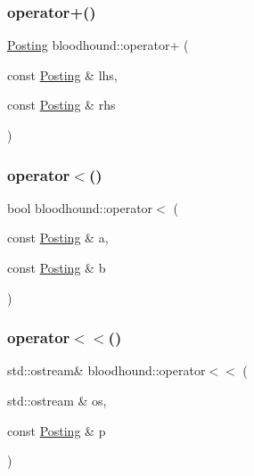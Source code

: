 \mbox{\label{namespacebloodhound_a0b07d73bf298a56b219b270d5fa70b83}} 
\subsubsection{\texorpdfstring{operator+()}{operator+()}}
{\footnotesize\ttfamily \hyperlink{structbloodhound_1_1Posting}{Posting} bloodhound\+::operator+ (\begin{DoxyParamCaption}\item[{const \hyperlink{structbloodhound_1_1Posting}{Posting} \&}]{lhs,  }\item[{const \hyperlink{structbloodhound_1_1Posting}{Posting} \&}]{rhs }\end{DoxyParamCaption})}

\mbox{\label{namespacebloodhound_ae20cf3f97304dde56dd526eaa08c41dc}} 
\subsubsection{\texorpdfstring{operator$<$()}{operator<()}}
{\footnotesize\ttfamily bool bloodhound\+::operator$<$ (\begin{DoxyParamCaption}\item[{const \hyperlink{structbloodhound_1_1Posting}{Posting} \&}]{a,  }\item[{const \hyperlink{structbloodhound_1_1Posting}{Posting} \&}]{b }\end{DoxyParamCaption})}

\mbox{\label{namespacebloodhound_a1422cc04658f6eb8616381224186059f}} 
\subsubsection{\texorpdfstring{operator$<$$<$()}{operator<<()}}
{\footnotesize\ttfamily std\+::ostream\& bloodhound\+::operator$<$$<$ (\begin{DoxyParamCaption}\item[{std\+::ostream \&}]{os,  }\item[{const \hyperlink{structbloodhound_1_1Posting}{Posting} \&}]{p }\end{DoxyParamCaption})}

